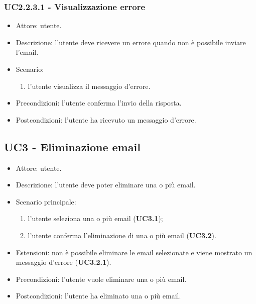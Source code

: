     \subsubsection{UC2.2.3.1 - Visualizzazione errore}
    \begin{itemize}
        \item Attore: utente.
        \item Descrizione: l'utente deve ricevere un errore quando non è possibile inviare l'email.
        \item Scenario:
        \begin{enumerate}
        \item l'utente visualizza il messaggio d'errore.
        \end{enumerate}  
        \item Precondizioni: l'utente conferma l'invio della risposta.
        \item Postcondizioni: l'utente ha ricevuto un messaggio d'errore.
    \end{itemize}

    \subsection{UC3 - Eliminazione email}
    \begin{itemize}
        \item Attore: utente.
        \item Descrizione: l'utente deve poter eliminare una o più email.
        \item Scenario principale:
            \begin{enumerate}
            \item l’utente seleziona una o più email (\textbf{UC3.1});
            \item l’utente conferma l'eliminazione di una o più email (\textbf{UC3.2}).
            \end{enumerate}
        \item Estensioni: non è possibile eliminare le email selezionate e viene mostrato un messaggio d'errore (\textbf{UC3.2.1}).
        \item Precondizioni: l'utente vuole eliminare una o più email.
        \item Postcondizioni: l'utente ha eliminato una o più email.
    \end{itemize}

